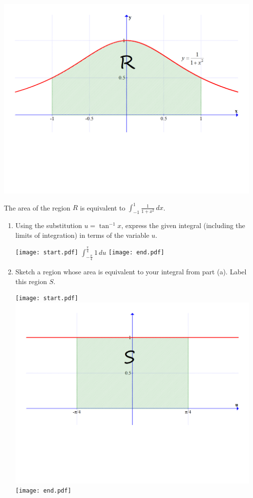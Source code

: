 \documentclass[12pt]{article}
\begin{document}
\begin{enumerate}
\begin{center}
\includegraphics[scale=0.3]{area.pdf}

\end{center}

The area of the region $R$ is equivalent to $\int_{-1}^1 \frac{1}{1+x^2} \,dx$.

\begin{enumerate}

\item Using the substitution $u=\tan^{-1}x$, express the given integral (including the limits of integration) in terms of the variable $u$.

\texttt{[image: start.pdf]}
{{$\int_{-\frac{\pi}{4}}^{\frac{\pi}{4}} 1 \,du$}}
\texttt{[image: end.pdf]}


\item Sketch a region whose area is equivalent to your integral from part (a).  Label this region $S$.

\texttt{[image: start.pdf]}
{{\includegraphics[scale=0.3]{area2.pdf}}}
\texttt{[image: end.pdf]}



\end{enumerate}
\end{enumerate}
\end{document}
